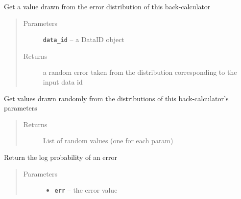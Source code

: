 \documentclass[letterpaper,10pt,english]{sphinxmanual}
\begin{document}
\begin{fulllineitems}
\begin{fulllineitems}
\begin{quote}
\begin{description}
\end{description}\end{quote}

\end{fulllineitems}


\begin{fulllineitems}
\label{modules:backcalc.BaseBackCalculator.get_random_err}
Get a value drawn from the error distribution of this back-calculator
\begin{quote}\begin{description}
\item[{Parameters}] \leavevmode
\textbf{\texttt{data\_id}} -- a DataID object

\item[{Returns}] \leavevmode
a random error taken from the distribution corresponding to the input data id

\end{description}\end{quote}

\end{fulllineitems}


\begin{fulllineitems}
\label{modules:backcalc.BaseBackCalculator.get_random_params}
Get values drawn randomly  from the distributions of this
back-calculator's parameters
\begin{quote}\begin{description}
\item[{Returns}] \leavevmode
List of random values (one for each param)

\end{description}\end{quote}

\end{fulllineitems}


\begin{fulllineitems}
\label{modules:backcalc.BaseBackCalculator.logp_err}
Return the log probability of an error
\begin{quote}\begin{description}
\item[{Parameters}] \leavevmode\begin{itemize}
\item {} 
\textbf{\texttt{err}} -- the error value


\end{itemize}
\end{description}
\end{quote}
\end{fulllineitems}
\end{fulllineitems}
\end{document}
